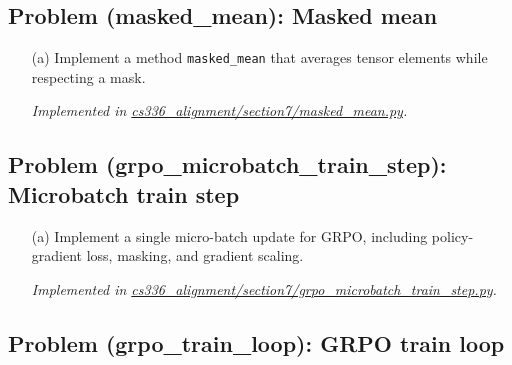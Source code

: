 \documentclass[letterpaper]{article}
\newcommand{\repofile}[2]{\href{https://github.com/echung32/ece405-assignment3-alignment/blob/main/#1}{#2}}
\begin{document}
	\subsection{Problem (masked\_mean): Masked mean}
	
	\begin{itemize}
		\item[(a)] Implement a method \texttt{masked\_mean} that averages tensor elements while respecting a mask.
		
		\textit{Implemented in \repofile{cs336_alignment/section7/masked_mean.py}{cs336\_alignment/section7/masked\_mean.py}.}
		
	\end{itemize}
	
	\subsection{Problem (grpo\_microbatch\_train\_step): Microbatch train step}
	
	\begin{itemize}
		\item[(a)] Implement a single micro-batch update for GRPO, including policy-gradient loss, masking, and gradient scaling.
		
		\textit{Implemented in \repofile{cs336_alignment/section7/grpo_microbatch_train_step.py}{cs336\_alignment/section7/grpo\_microbatch\_train\_step.py}.}
		
	\end{itemize}
	
	\subsection{Problem (grpo\_train\_loop): GRPO train loop}
	
\end{document}

